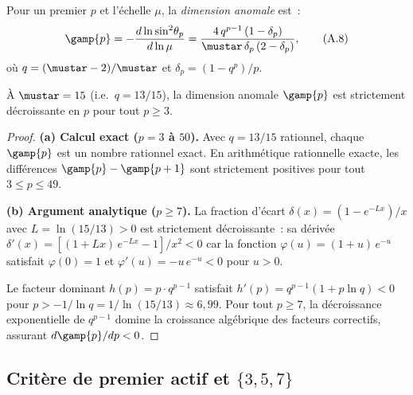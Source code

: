 \documentclass[12pt,a4paper]{article}
\begin{document}
\begin{derivedbox}
Pour un premier $p$ et l'\'echelle $\mu$, la \emph{dimension anomale}
est~:
\begin{equation}
  \gamp{p} = -\frac{d \ln \sin^2\!\theta_p}{d \ln \mu}
  = \frac{4\,q^{p-1}\,(1 - \delta_p)}{\mustar\,\delta_p\,(2 - \delta_p)},
  \tag{A.8}
\end{equation}
o\`u $q = (\mustar - 2)/\mustar$ et
$\delta_p = (1 - q^p)/p$.
\end{derivedbox}

\begin{theorembox}
\`A $\mustar = 15$ (i.e.\ $q = 13/15$), la dimension anomale
$\gamp{p}$ est strictement d\'ecroissante en $p$ pour tout
$p \geq 3$.

\begin{proof}
\textbf{(a) Calcul exact ($p = 3$ \`a $50$).}
Avec $q = 13/15$ rationnel, chaque $\gamp{p}$ est un nombre rationnel
exact. En arithm\'etique rationnelle exacte, les diff\'erences
$\gamp{p} - \gamp{p+1}$ sont strictement positives pour tout
$3 \leq p \leq 49$.

\textbf{(b) Argument analytique ($p \geq 7$).}
La fraction d'\'ecart $\delta(x) = (1 - e^{-Lx})/x$ avec
$L = \ln(15/13) > 0$ est strictement d\'ecroissante~: sa d\'eriv\'ee
$\delta'(x) = [(1 + Lx)\,e^{-Lx} - 1]/x^2 < 0$ car la fonction
$\varphi(u) = (1+u)\,e^{-u}$ satisfait $\varphi(0) = 1$ et
$\varphi'(u) = -u\,e^{-u} < 0$ pour $u > 0$.

Le facteur dominant $h(p) = p \cdot q^{p-1}$ satisfait
$h'(p) = q^{p-1}(1 + p\ln q) < 0$ pour
$p > -1/\ln q = 1/\ln(15/13) \approx 6{,}99$. Pour tout $p \geq 7$,
la d\'ecroissance exponentielle de $q^{p-1}$ domine la croissance
alg\'ebrique des facteurs correctifs, assurant $d\gamp{p}/dp < 0$.
\end{proof}
\end{theorembox}

\subsection{Crit\`ere de premier actif et $\{3,5,7\}$}
\label{app:active}
\end{document}

